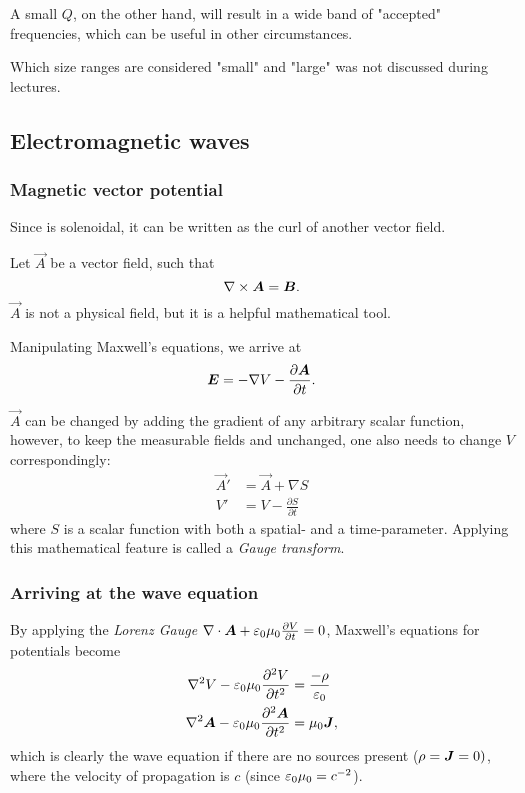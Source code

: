         A small $Q$, on the other hand, will result in a wide band of "accepted" frequencies, which can be useful in other circumstances.
    
        Which size ranges are considered "small" and "large" was not discussed during lectures. 

\subsection{Electromagnetic waves}
    \subsubsection{Magnetic vector potential}
        Since \B{} is solenoidal, it can be written as the curl of another vector field. 
        
        Let $\vec{A}$ be a vector field, such that
        \begin{equation}
            \nabla \times \bm{A} = \bm{B}.
        \end{equation}
        $\vec{A}$ is not a physical field, but it is a helpful mathematical tool. 

        Manipulating Maxwell's equations, we arrive at 
        \begin{equation}
            \bm{E} = -\nabla V - \frac{\partial \bm{A}}{\partial t}.
        \end{equation}
        
        $\vec{A}$ can be changed by adding the gradient of any arbitrary scalar function, 
        however, to keep the measurable fields \B{} and \E{} unchanged, one also needs to change $V$ correspondingly:
        \begin{align*}
            \vec{A}' &= \vec{A} + \nabla S \\
            V' &= V - \frac{\partial S}{\partial t}
        \end{align*}
        where $S$ is a scalar function with both a spatial- and a time-parameter.
        Applying this mathematical feature is called a \textit{Gauge transform}.

    \subsubsection*{Arriving at the wave equation}
        By applying the \textit{Lorenz Gauge} $\nabla\cdot\bm{A} + \varepsilon_0\mu_0\frac{\partial V}{\partial t} = 0$, 
        Maxwell's equations for potentials become 
        \begin{align}
            \label{Maxwells for potentials 1}
            \nabla^2V - \varepsilon_0\mu_0\frac{\partial^2V}{\partial t^2} &= \frac{-\rho}{\varepsilon_0}\\
            \nabla^2\bm{A} - \varepsilon_0\mu_0\frac{\partial^2\bm{A}}{\partial t^2} &= \mu_0\bm{J},
            \label{Maxwells for potentials 2}
        \end{align}
        which is clearly the wave equation if there are no sources present ($\rho = \bm{J} = 0)$, 
        where the velocity of propagation is $c$ (since $\varepsilon_0\mu_0 = c^{-2}$).

